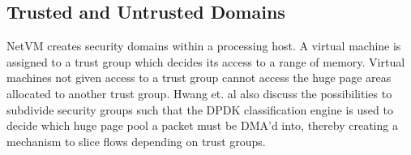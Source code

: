 \subsection*{Trusted and Untrusted Domains}
NetVM creates security domains within a processing host. A virtual machine is assigned to a trust group which decides its access to a range of memory. Virtual machines not given access to a trust group cannot access the huge page areas allocated to another trust group. Hwang et. al also discuss the possibilities to subdivide security groups such that the DPDK classification engine is used to decide which huge page pool a packet must be DMA'd into, thereby creating a mechanism to slice flows depending on trust groups.



